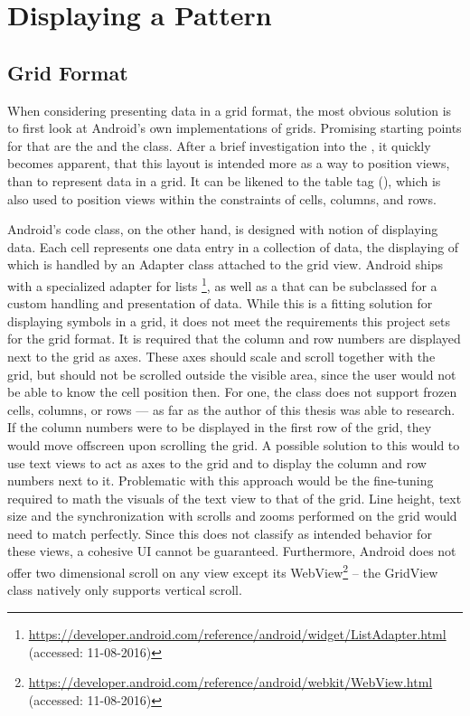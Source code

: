 \section{Displaying a Pattern}

\subsection{Grid Format}
\label{impl_grid_format}
When considering presenting data in a grid format, the most obvious solution is to first look at Android's own implementations of grids. Promising starting points for that are the  and the  class. After a brief investigation into the , it quickly becomes apparent, that this layout is intended more as a way to position views, than to represent data in a grid. It can be likened to the  table tag (\cite{android_tablelayout}), which is also used to position views within the constraints of cells, columns, and rows.

Android's code class, on the other hand, is designed with notion of displaying data. Each cell represents one data entry in a collection of data, the displaying of which is handled by an Adapter class attached to the grid view. Android ships with a specialized adapter for lists \footnote{\url{https://developer.android.com/reference/android/widget/ListAdapter.html} (accessed: 11-08-2016)}, as well as a  that can be subclassed for a custom handling and presentation of data. While this is a fitting solution for displaying symbols in a grid, it does not meet the requirements this project sets for the grid format. It is required that the column and row numbers are displayed next to the grid as axes. These axes should scale and scroll together with the grid, but should not be scrolled outside the visible area, since the user would not be able to know the cell position then. For one, the  class does not support frozen cells, columns, or rows --- as far as the author of this thesis was able to research. If the column numbers were to be displayed in the first row of the grid, they would move offscreen upon scrolling the grid. A possible solution to this would to use text views to act as axes to the grid and to display the column and row numbers next to it. Problematic with this approach would be the fine-tuning required to math the visuals of the text view to that of the grid. Line height, text size and the synchronization with scrolls and zooms performed on the grid would need to match perfectly. Since this does not classify as intended behavior for these views, a cohesive \gls{UI} cannot be guaranteed. Furthermore, Android does not offer two dimensional scroll on any view except its WebView\footnote{\url{https://developer.android.com/reference/android/webkit/WebView.html} (accessed: 11-08-2016)} -- the GridView class natively only supports vertical scroll.

